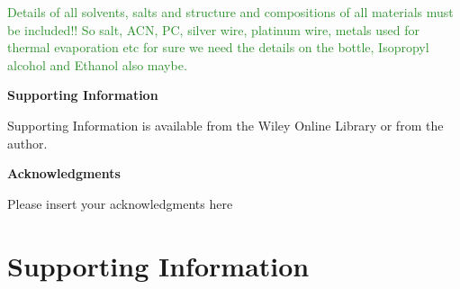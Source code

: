 \documentclass{WileyMSP-template}
\newcommand{\np}[1]{\textcolor{ForestGreen}{#1}}
\begin{document}
\np{Details of all solvents, salts and structure and compositions of all materials must be included!! So salt, ACN, PC, silver wire, platinum wire, metals used for thermal evaporation etc for sure we need the details on the bottle, Isopropyl alcohol and Ethanol also maybe.}

\bigbreak

\medskip

\textbf{Supporting Information} \par %
Supporting Information is available from the Wiley Online Library or from the author.



\medskip
\textbf{Acknowledgments} \par %
Please insert your acknowledgments here

\medskip

%
%
%












\newpage

\section{Supporting Information}
\renewcommand{\thefigure}{S\arabic{figure}}
\setcounter{figure}{0}
\end{document}
